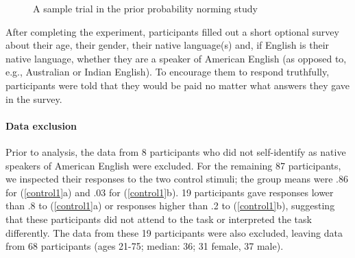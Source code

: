 \documentclass[11pt,fleqn]{article}
\newcommand{\6}{\mbox{$[\hspace*{-.6mm}[$}}
\newcommand{\9}{\mbox{$]\hspace*{-.6mm}]$}}
\begin{document}
\begin{figure}[h!]
\begin{center}
\end{center}
\caption{A sample trial in the prior probability norming study}\label{f-trial-exp1}
\end{figure}

After completing the experiment, participants filled out a short optional survey about their age, their gender, their native language(s) and, if English is their native language, whether they are a speaker of American English (as opposed to, e.g., Australian or Indian English). To encourage them to respond truthfully, participants were told that they would be paid no matter what answers they gave in the survey. 

\paragraph{Data exclusion}
Prior to analysis, the data from 8 participants who did not self-identify as native speakers of American English were excluded. For the remaining 87 participants, we inspected their responses to the two control stimuli; the group means were .86 for (\ref{control1}a) and .03 for (\ref{control1}b). 19 participants gave responses lower than .8 to (\ref{control1}a) or responses higher than .2 to (\ref{control1}b), suggesting that these participants did not attend to the task or interpreted the task differently. The data from these 19 participants were also excluded, leaving data from 68 participants (ages 21-75; median: 36; 31 female, 37 male).  
\end{document}
